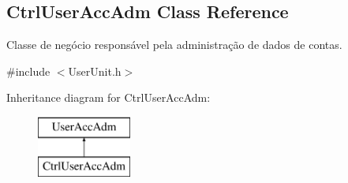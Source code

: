 \hypertarget{classCtrlUserAccAdm}{\subsection{Ctrl\-User\-Acc\-Adm Class Reference}
\label{db/d93/classCtrlUserAccAdm}
}


Classe de negócio responsável pela administração de dados de contas.  




{\ttfamily \#include $<$User\-Unit.\-h$>$}

Inheritance diagram for Ctrl\-User\-Acc\-Adm\-:\begin{figure}[H]
\begin{center}
\leavevmode
\includegraphics[height=2.000000cm]{db/d93/classCtrlUserAccAdm}
\end{center}
\end{figure}
